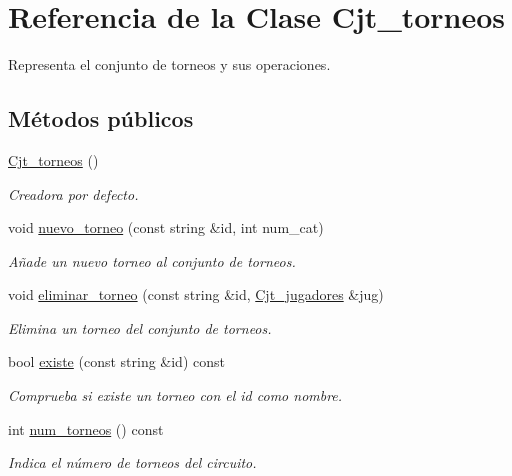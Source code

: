 \hypertarget{class_cjt__torneos}{}\section{Referencia de la Clase Cjt\+\_\+torneos}
\label{class_cjt__torneos}


Representa el conjunto de torneos y sus operaciones.  


\subsection*{Métodos públicos}
\begin{DoxyCompactItemize}
\item 
\hyperlink{class_cjt__torneos_acc82582b779afd52bbb92c8094d473ac}{Cjt\+\_\+torneos} ()
\begin{DoxyCompactList}\small\item\em Creadora por defecto. \end{DoxyCompactList}\item 
void \hyperlink{class_cjt__torneos_a7385438366fe4d50e6cf82aa6c381c08}{nuevo\+\_\+torneo} (const string \&id, int num\+\_\+cat)
\begin{DoxyCompactList}\small\item\em Añade un nuevo torneo al conjunto de torneos. \end{DoxyCompactList}\item 
void \hyperlink{class_cjt__torneos_abcf5af8c44e1a82fec482aa1a0abacb2}{eliminar\+\_\+torneo} (const string \&id, \hyperlink{class_cjt__jugadores}{Cjt\+\_\+jugadores} \&jug)
\begin{DoxyCompactList}\small\item\em Elimina un torneo del conjunto de torneos. \end{DoxyCompactList}\item 
bool \hyperlink{class_cjt__torneos_ab7cf8c8a93172e3097e3e40c9bc55255}{existe} (const string \&id) const
\begin{DoxyCompactList}\small\item\em Comprueba si existe un torneo con el id como nombre. \end{DoxyCompactList}\item 
int \hyperlink{class_cjt__torneos_aba6d57df308bdbfa173578c108e19b82}{num\+\_\+torneos} () const
\begin{DoxyCompactList}\small\item\em Indica el número de torneos del circuito. \end{DoxyCompactList}\item 

\end{DoxyCompactItemize}

